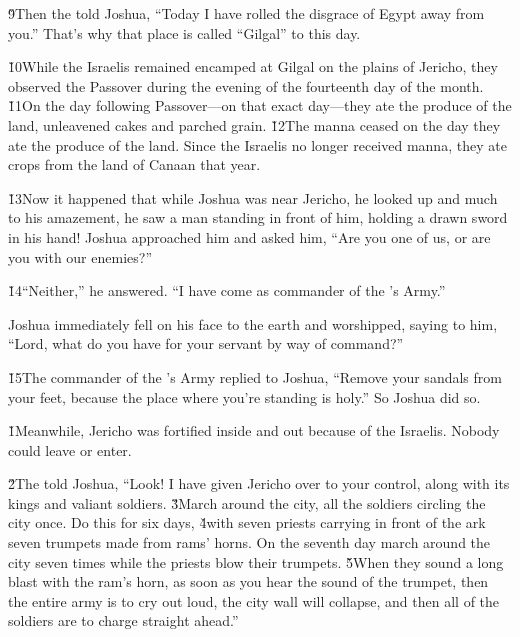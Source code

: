 \v{9}Then the  told Joshua, ``Today I have rolled the disgrace of Egypt away from you.'' That's why that place is called ``Gilgal'' to this day.

\v{10}While the Israelis remained encamped at Gilgal on the plains of Jericho, they observed the Passover during the evening of the fourteenth day of the month. \v{11}On the day following Passover---on that exact day---they ate the produce of the land, unleavened cakes and parched grain. \v{12}The manna ceased on the day they ate the produce of the land. Since the Israelis no longer received manna, they ate crops from the land of Canaan that year.

\v{13}Now it happened that while Joshua was near Jericho, he looked up and much to his amazement, he saw a man standing in front of him, holding a drawn sword in his hand! Joshua approached him and asked him, ``Are you one of us, or are you with our enemies?''

\v{14}``Neither,'' he answered. ``I have come as commander of the 's Army.''

Joshua immediately fell on his face to the earth and worshipped, saying to him, ``Lord, what do you have for your servant by way of command?''

\v{15}The commander of the 's Army replied to Joshua, ``Remove your sandals from your feet, because the place where you're standing is holy.'' So Joshua did so.

\v{1}Meanwhile, Jericho was fortified inside and out because of the Israelis. Nobody could leave or enter.

\v{2}The  told Joshua, ``Look! I have given Jericho over to your control, along with its kings and valiant soldiers. \v{3}March around the city, all the soldiers circling the city once. Do this for six days, \v{4}with seven priests carrying in front of the ark seven trumpets made from rams' horns. On the seventh day march around the city seven times while the priests blow their trumpets. \v{5}When they sound a long blast with the ram's horn, as soon as you hear the sound of the trumpet, then the entire army is to cry out loud, the city wall will collapse, and then all of the soldiers are to charge straight ahead.''

